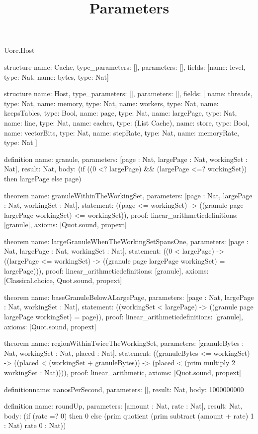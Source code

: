 \begin{lexlean}{Uorc.Host}
\title{Parameters}
\begin{semanticmodule}
structure{
  name: Cache,
  type_parameters: [],
  parameters: [],
  fields: [{name: level, type: Nat}, {name: bytes, type: Nat}]
}

structure{
  name: Host,
  type_parameters: [],
  parameters: [],
  fields: [
    {name: threads, type: Nat},
    {name: memory, type: Nat},
    {name: workers, type: Nat},
    {name: keepsTables, type: Bool},
    {name: page, type: Nat},
    {name: largePage, type: Nat},
    {name: line, type: Nat},
    {name: caches, type: (List Cache)},
    {name: store, type: Bool},
    {name: vectorBits, type: Nat},
    {name: stepRate, type: Nat},
    {name: memoryRate, type: Nat}
  ]
}

definition{
  name: granule,
  parameters: [page : Nat, largePage : Nat, workingSet : Nat],
  result: Nat,
  body: (if ((0 <? largePage) && (largePage <=? workingSet)) then largePage else page)
}

theorem{
  name: granuleWithinTheWorkingSet,
  parameters: [page : Nat, largePage : Nat, workingSet : Nat],
  statement: ((page <= workingSet) -> ((granule page largePage workingSet) <= workingSet)),
  proof: linear_arithmetic{definitions: [granule]},
  axioms: [Quot.sound, propext]
}

theorem{
  name: largeGranuleWhenTheWorkingSetSpansOne,
  parameters: [page : Nat, largePage : Nat, workingSet : Nat],
  statement: ((0 < largePage) -> ((largePage <= workingSet) -> ((granule page largePage workingSet) = largePage))),
  proof: linear_arithmetic{definitions: [granule]},
  axioms: [Classical.choice, Quot.sound, propext]
}

theorem{
  name: baseGranuleBelowALargePage,
  parameters: [page : Nat, largePage : Nat, workingSet : Nat],
  statement: ((workingSet < largePage) -> ((granule page largePage workingSet) = page)),
  proof: linear_arithmetic{definitions: [granule]},
  axioms: [Quot.sound, propext]
}

theorem{
  name: regionWithinTwiceTheWorkingSet,
  parameters: [granuleBytes : Nat, workingSet : Nat, placed : Nat],
  statement: ((granuleBytes <= workingSet) -> ((placed < (workingSet + granuleBytes)) -> (placed < (prim multiply 2 workingSet : Nat)))),
  proof: linear_arithmetic{},
  axioms: [Quot.sound, propext]
}

definition{name: nanosPerSecond, parameters: [], result: Nat, body: 1000000000}

definition{
  name: roundUp,
  parameters: [amount : Nat, rate : Nat],
  result: Nat,
  body: (if (rate =? 0) then 0 else (prim quotient (prim subtract (amount + rate) 1 : Nat) rate 0 : Nat))
}


\end{semanticmodule}
\end{lexlean}
